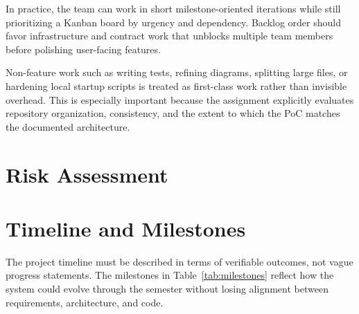 In practice, the team can work in short milestone-oriented iterations while still prioritizing a Kanban
board by urgency and dependency. Backlog order should favor infrastructure and contract work that unblocks
multiple team members before polishing user-facing features.

Non-feature work such as writing tests, refining diagrams, splitting large files, or hardening local
startup scripts is treated as first-class work rather than invisible overhead. This is especially
important because the assignment explicitly evaluates repository organization, consistency, and the extent
to which the PoC matches the documented architecture.

\section{Risk Assessment}



\section{Timeline and Milestones}

The project timeline must be described in terms of verifiable outcomes, not vague progress statements.
The milestones in Table~\ref{tab:milestones} reflect how the system could evolve through the semester
without losing alignment between requirements, architecture, and code.


